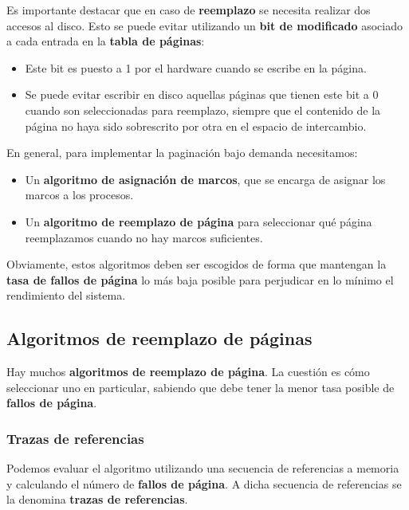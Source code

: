 Es importante destacar que en caso de \textbf{reemplazo} se necesita
realizar dos accesos al disco. Esto se puede evitar utilizando un
\textbf{bit de modificado}{} asociado a cada entrada en la \textbf{tabla
de páginas}:

\begin{itemize}
\item
  Este bit es puesto a 1 por el hardware cuando se escribe en la página.
\item
  Se puede evitar escribir en disco aquellas páginas que tienen este bit
  a 0 cuando son seleccionadas para reemplazo, siempre que el contenido
  de la página no haya sido sobrescrito por otra en el espacio de
  intercambio.
\end{itemize}

En general, para implementar la paginación bajo demanda necesitamos:

\begin{itemize}
\item
  Un \textbf{algoritmo de asignación de marcos}, que se encarga de
  asignar los marcos a los procesos.
\item
  Un \textbf{algoritmo de reemplazo de página} para seleccionar qué
  página reemplazamos cuando no hay marcos suficientes.
\end{itemize}

Obviamente, estos algoritmos deben ser escogidos de forma que mantengan
la \textbf{tasa de fallos de página} lo más baja posible para perjudicar
en lo mínimo el rendimiento del sistema.

\subsection{Algoritmos de reemplazo de
páginas}\label{_algoritmos_de_reemplazo_de_puxe1ginas}

{} Hay muchos \textbf{algoritmos de reemplazo de página}. La cuestión es
cómo seleccionar uno en particular, sabiendo que debe tener la menor
tasa posible de \textbf{fallos de página}.

\subsubsection{Trazas de referencias}\label{_trazas_de_referencias}

{} Podemos evaluar el algoritmo utilizando una secuencia de referencias
a memoria y calculando el número de \textbf{fallos de página}. A dicha
secuencia de referencias se la denomina \textbf{trazas de referencias}.

